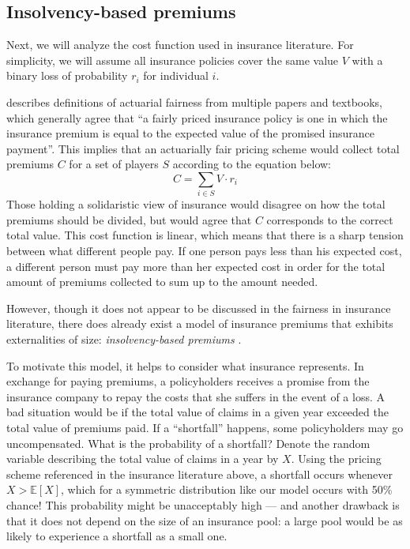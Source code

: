 \documentclass[sigconf]{acmart}
\newcommand{\V}[0]{\ensuremath{V}}
\newcommand{\cd}[0]{\cdot}
\begin{document}
\subsection{Insolvency-based premiums}
Next, we will analyze the cost function used in insurance literature. For simplicity, we will assume all insurance policies cover the same value $\V$ with a binary loss of probability $r_i$ for individual $i$. 

\citet{meyers2018enacting} describes definitions of actuarial fairness from multiple papers and textbooks, which generally agree that \enquote{a fairly priced insurance policy is one in which the insurance premium is equal to the expected value of the promised insurance payment}. This implies that an actuarially fair pricing scheme would collect total premiums $C$ for a set of players $S$ according to the equation below:
$$C = \sum_{i \in S}\V \cd r_i$$
Those holding a solidaristic view of insurance would disagree on how the total premiums should be divided, but would agree that $C$ corresponds to the correct total value. This cost function is linear, which means that there is a sharp tension between what different people pay. If one person pays less than his expected cost, a different person must pay more than her expected cost in order for the total amount of premiums collected to sum up to the amount needed. 

However, though it does not appear to be discussed in the fairness in insurance literature, there does already exist a model of insurance premiums that exhibits externalities of size: \emph{insolvency-based premiums} \cite{olivieri2015introduction}. 

To motivate this model, it helps to consider what insurance represents. In exchange for paying premiums, a policyholders receives a promise from the insurance company to repay the costs that she suffers in the event of a loss. A bad situation would be if the total value of claims in a given year exceeded the total value of premiums paid. If a \enquote{shortfall} happens, some policyholders may go uncompensated. What is the probability of a shortfall? Denote the random variable describing the total value of claims in a year by $X$. Using the pricing scheme referenced in the insurance literature above, a shortfall occurs whenever $X > \mathbb{E}[X]$, which for a symmetric distribution like our model occurs with 50\% chance! This probability might be unacceptably high --- and another drawback is that it does not depend on the size of an insurance pool: a large pool would be as likely to experience a shortfall as a small one. 
\end{document}
